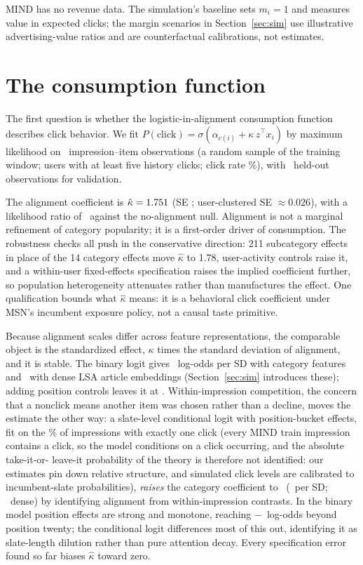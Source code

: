 \documentclass[11pt]{article}
\begin{document}
MIND has no revenue data. The simulation's baseline sets $m_i=1$ and
measures value in expected clicks; the margin scenarios in
Section~\ref{sec:sim} use illustrative advertising-value ratios and are
counterfactual calibrations, not estimates.

\section{The consumption function}\label{sec:cons}

The first question is whether the logistic-in-alignment consumption
function describes click behavior. We fit
$P(\text{click})=\sigma(\alpha_{c(i)}+\kappa\, z^\top x_i)$ by maximum
likelihood on \nfit\ impression--item observations (a random sample of the
training window; users with at least five history clicks; click rate
\clickrate\%), with \ntest\ held-out observations for validation.

The alignment coefficient is $\hat\kappa=1.751$ (SE \kappase;
user-clustered SE $\approx 0.026$), with a likelihood ratio of \LRkappa\
against the no-alignment null. Alignment is not a marginal refinement of
category popularity; it is a first-order driver of consumption. The
robustness checks all push in the conservative direction: 211 subcategory
effects in place of the 14 category effects move $\hat\kappa$ to 1.78,
user-activity controls raise it, and a within-user fixed-effects
specification raises the implied coefficient further, so population
heterogeneity attenuates rather than manufactures the effect. One
qualification bounds what $\hat\kappa$ means: it is a behavioral click
coefficient under MSN's incumbent exposure policy, not a causal taste
primitive.

Because alignment scales differ across feature representations, the
comparable object is the standardized effect, $\kappa$ times the standard
deviation of alignment, and it is stable. The binary logit gives
\kapAsd\ log-odds per SD with category features and \kapBsd\ with dense LSA
article embeddings (Section~\ref{sec:sim} introduces these); adding position
controls leaves it at \kapCsd. Within-impression competition, the concern
that a nonclick means another item was chosen rather than a decline, moves
the estimate the other way: a slate-level conditional logit with
position-bucket effects, fit on the \singleclick\% of impressions with
exactly one click (every MIND train impression contains a click, so the
model conditions on a click occurring, and the absolute take-it-or-
leave-it probability of the theory is therefore not identified: our
estimates pin down relative structure, and simulated click levels are
calibrated to incumbent-slate probabilities), \emph{raises} the category
coefficient to \kapDcat\ (\kapDcatsd\ per SD; \kapDdensesd\ dense) by
identifying alignment from within-impression contrasts. In the binary model
position effects are strong and monotone, reaching $-$\posfar\ log-odds
beyond position twenty; the conditional logit differences most of this out,
identifying it as slate-length dilution rather than pure attention decay.
Every specification error found so far biases $\hat\kappa$ toward zero.
\end{document}
